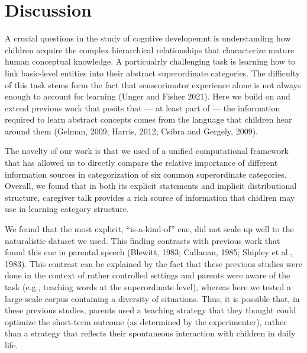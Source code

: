 \documentclass[english,,man,floatsintext]{apa6}
\begin{document}
\hypertarget{discussion}{%
\section{Discussion}\label{discussion}}

A crucial questions in the study of cogntive developemnt is understanding how children acquire the complex hierarchical relationships that characterize mature human conceptual knowledge. A particualrly challenging task is learning how to link basic-level entities into their abstract superordinate categories. The difficulty of this task stems form the fact that senseorimotor experience alone is not always enough to account for learning (Unger and Fisher 2021). Here we build on and extend previous work that posits that --- at least part of --- the information required to learn abstract concepts comes from the language that children hear around them (Gelman, 2009; Harris, 2012; Csibra and Gergely, 2009).

The novelty of our work is that we used of a unified computational framework that has allowed us to directly compare the relative importance of different information sources in categorization of six common superordinate categories. Overall, we found that in both its explicit statements and implicit distributional structure, caregiver talk provides a rich source of information that chidlren may use in learning category structure.

We found that the most explicit, \enquote{is-a-kind-of} cue, did not scale up well to the naturalistic dataset we used. This finding contrasts with previous work that found this cue in parental
speech (Blewitt, 1983; Callanan, 1985; Shipley et al., 1983). This contrast can be explained by the fact that these previous studies were done in the context of rather controlled settings and parents
were aware of the task (e.g., teaching words at the superordinate level), whereas here we tested a large-scale corpus containing a diversity of situations. Thus, it is possible that, in these previous studies, parents used a teaching strategy that they thought could optimize the short-term outcome (as determined by the experimenter), rather than a strategy that reflects their spontaneous interaction with children in daily life.
\end{document}
